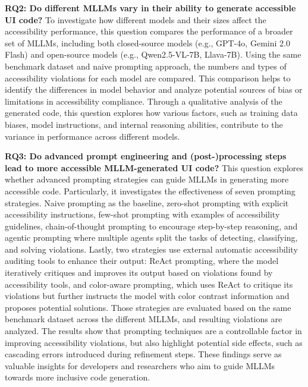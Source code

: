 \textbf{RQ2: Do different MLLMs vary in their ability to generate accessible UI code?}
To investigate how different models and their sizes affect the 
accessibility performance, this question compares the performance of 
a broader set of MLLMs, including both closed-source models
(e.g., GPT-4o, Gemini 2.0 Flash) and open-source
models (e.g., Qwen2.5-VL-7B, Llava-7B). Using the same benchmark dataset and 
naive prompting approach, the numbers and types of accessibility 
violations for each model are compared. This comparison helps to
identify the differences in model behavior and analyze potential 
sources of bias or limitations in accessibility compliance. 
Through a qualitative analysis of the generated code, this question 
explores how various factors, such as training data biases, model instructions, and
internal reasoning abilities, contribute to the variance in
performance across different models.
\newline

\textbf{RQ3: Do advanced prompt engineering and (post-)processing steps lead to more accessible MLLM-generated UI
code?}
This question explores whether advanced prompting strategies can guide 
MLLMs in generating more accessible code. Particularly, it investigates
the effectiveness of seven prompting strategies. Naive prompting as the
baseline, zero-shot prompting with explicit accessibility instructions,
few-shot prompting with examples of accessibility guidelines,
chain-of-thought prompting to encourage step-by-step reasoning, and
agentic prompting where multiple agents split the tasks of
detecting, classifying, and solving violations. 
Lastly, two strategies use external automatic accessibility auditing tools to enhance their output:
ReAct prompting, where the model iteratively critiques and improves 
its output based on violations found by accessibility tools, 
and color-aware prompting, which uses ReAct to critique its violations but 
further instructs the model with color contrast information and proposes
potential solutions. Those strategies are evaluated based on the same 
benchmark dataset across the different MLLMs, and resulting violations 
are analyzed. 
The results show that prompting techniques are a controllable
factor in improving accessibility violations, but also highlight
potential side effects, such as cascading
errors introduced during refinement steps.
These findings serve as valuable insights for developers and researchers
who aim to guide MLLMs towards more inclusive code generation.\newline


